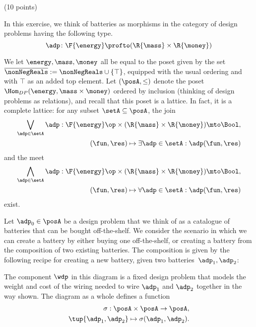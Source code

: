 \documentclass[paper=8.125in:10.250in,pagesize=pdftex,
    headinclude=false,footinclude=false,oneside,egregdoesnotlikesansseriftitles]{kaobook}
\begin{document}

\newpage


\begin{gradedexercise}\label{ex:BatteryDP} (10 points)

In this exercise, we think of batteries as morphisms in the category of design problems having the following type.
    \begin{equation}
        \adp \colon \F{\energy}\profto (\R{\mass}\times \R{\money})
    \end{equation}
    \begin{center}
    \end{center}
We let $\energy,\mass,\money$ all be equal to the poset given by the set $\overline{\nonNegReals} := \nonNegReals \cup \{\top\}$, equipped with the usual ordering and with $\top$ as an added top element. Let $(\posA, \leq)$ denote the poset $\Hom_{DP}(\energy, \mass \times \money)$ ordered by inclusion (thinking of design problems as relations), and recall that this poset is a lattice. In fact, it is a complete lattice: for any subset $\setA \subseteq \posA$, the join
\begin{eqnarray}
\bigvee_{\adp \in \setA} \adp : \F{\energy}\op \times (\R{\mass}\times \R{\money}) \mto \Bool, \\
(\fun, \res) \mapsto \exists \adp \in \setA : \adp(\fun, \res)
\end{eqnarray}
and the meet
\begin{eqnarray}
\bigwedge_{\adp \in \setA} \adp : \F{\energy}\op \times (\R{\mass}\times \R{\money}) \mto \Bool,\\ (\fun, \res) \mapsto \forall \adp \in \setA : \adp(\fun, \res)
\end{eqnarray}
exist.  

Let $\adp_0 \in \posA$ be a design problem that we think of as a catalogue 
of batteries that can be bought off-the-shelf. We consider the scenario in which we can create a battery by either buying one off-the-shelf, or creating a battery from the composition of two existing batteries. The composition is given by the following recipe for creating a new battery, given two batteries~$\adp_1,\adp_2$:
    \begin{center}
    \end{center}
The component $\wdp$ in this diagram is a fixed design problem that models the weight and cost of the wiring needed to wire $\adp_1$ and $\adp_2$ together in the way shown. The diagram as a whole defines a function 
\begin{eqnarray}
\sigma: \posA \times \posA \to \posA,\\ \tup{\adp_1,\adp_2} \mapsto \sigma(\adp_1,\adp_2).
\end{eqnarray}


\end{gradedexercise}
\end{document}
